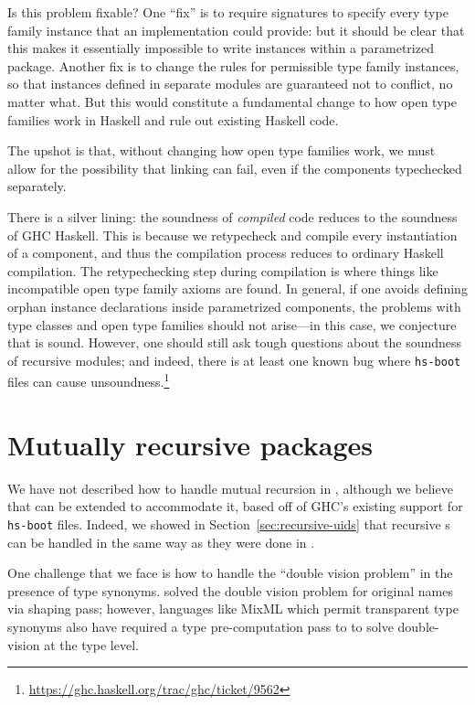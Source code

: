 Is this problem fixable?  One ``fix'' is to require signatures to
specify every type family instance that an implementation could provide:
but it should be clear that this makes it essentially impossible to
write instances within a parametrized package.  Another fix is to change the rules for
permissible type family instances, so that instances defined in separate
modules are guaranteed not to conflict, no matter what.  But this would
constitute a fundamental change to how open type families work in
Haskell and rule out existing Haskell code.

The upshot is that, without changing how open type families work, we
must allow for the possibility that linking can fail, even if the
components typechecked separately.


There is a silver lining: the soundness of
\emph{compiled} \Backpack{} code reduces to the soundness of GHC
Haskell.  This is because we retypecheck and compile every instantiation
of a component, and thus the compilation process reduces to ordinary
Haskell compilation.  The retypechecking step during compilation is
where things like incompatible open type family axioms are found.
In general, if one avoids defining orphan instance declarations inside parametrized components, the problems with type
classes and open type families should not arise---in this case,
we conjecture that \Backpack{} is sound.  However, one should
still ask tough questions about the soundness of recursive modules;
and indeed, there is at least one known bug where \verb|hs-boot|
files can cause unsoundness.\footnote{\url{https://ghc.haskell.org/trac/ghc/ticket/9562}}

\section{Mutually recursive packages}

We have not described how to handle mutual recursion in \Backpack{},
although we believe that \Backpack{} can be extended to accommodate it,
based off of GHC's existing support for \verb|hs-boot| files.
Indeed, we showed in Section~\ref{sec:recursive-uids} that recursive
\uid{}s can be handled in the same way as they were done in \OldBackpack{}.

One challenge that we face is how to handle the ``double vision
problem'' in the presence of type synonyms.  \OldBackpack{} solved the
double vision problem for original names via  shaping pass; however,
languages like MixML which permit transparent type synonyms also have
required a type pre-computation pass to to solve double-vision at the
type level.


